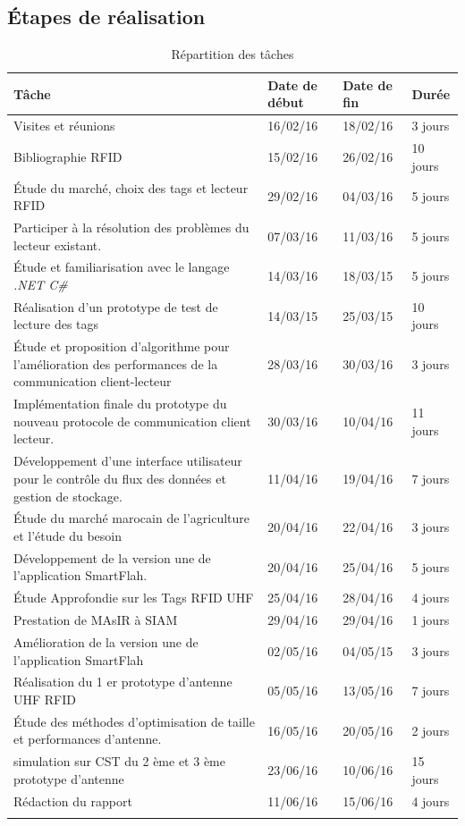 \documentclass[11pt, a4paper, twoside]{book}
\begin{document}
\subsection{Étapes	de réalisation}
\begin{longtable}{|p{}|p{}|p{}| p{}|}
\hline
\textbf{Tâche} & \textbf{Date de début} & \textbf{Date de fin} & \textbf{Durée} \\
\hline
Visites et réunions & 16/02/16 & 18/02/16 & 3 jours \\
\hline
Bibliographie RFID & 15/02/16 & 26/02/16 & 10 jours \\
\hline
Étude du marché, choix des tags et lecteur RFID & 29/02/16 & 04/03/16 & 5 jours \\
\hline
Participer à  la résolution des problèmes du lecteur existant.
 & 07/03/16 & 11/03/16 & 5 jours \\
\hline
Étude et familiarisation avec le langage \emph{.NET C\#} & 14/03/16 & 18/03/15 & 5 jours \\
\hline
Réalisation d'un prototype de test de lecture des tags & 14/03/15 & 25/03/15 & 10 jours \\
\hline
 Étude et proposition d'algorithme pour l'amélioration des performances de la communication client-lecteur
 & 28/03/16 & 30/03/16 & 3 jours \\
\hline
Implémentation finale du prototype du nouveau protocole de communication client lecteur.
 & 30/03/16 & 10/04/16 & 11 jours \\
\hline
Développement d'une interface utilisateur pour le contrôle du flux des données et gestion de stockage.
 & 11/04/16 & 19/04/16 & 7 jours \\
\hline
Étude du marché marocain de l'agriculture et l'étude du besoin & 20/04/16 & 22/04/16 & 3 jours \\
\hline
Développement de la version une de l'application SmartFlah. & 20/04/16 & 25/04/16 & 5 jours \\
\hline
Étude Approfondie sur les Tags RFID UHF  & 25/04/16 & 28/04/16 & 4 jours \\
\hline
Prestation de MAsIR à SIAM  & 29/04/16 & 29/04/16 & 1 jours \\
\hline
Amélioration de la version une de l'application SmartFlah & 02/05/16 & 04/05/15 & 3 jours \\
\hline
Réalisation du 1 er prototype d'antenne UHF RFID & 05/05/16 & 13/05/16 & 7 jours \\
\hline
Étude des méthodes d'optimisation de taille et performances d'antenne. & 16/05/16 & 20/05/16 & 2 jours \\
\hline
simulation sur CST du 2 ème et 3 ème prototype d'antenne & 23/06/16 & 10/06/16 & 15 jours \\
\hline
Rédaction du rapport & 11/06/16 & 15/06/16 & 4 jours \\
\hline
\caption{Répartition des tâches}
\end{longtable}
\end{document}
